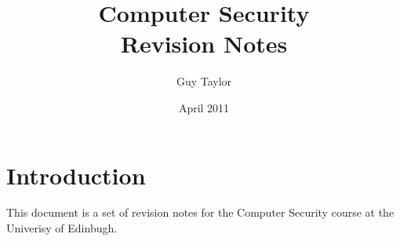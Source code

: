 \documentclass[11pt,twoside,a4paper]{article}
\begin{document}
  
  \title{Computer Security \\Revision Notes}
  \author{Guy Taylor}
  \date{April 2011}
  
  \maketitle
  
  \tableofcontents
  
  \section{Introduction}
    This document is a set of revision notes for the Computer Security \cite{cs_home} course at the Univerisy of Edinbugh.
\end{document}
